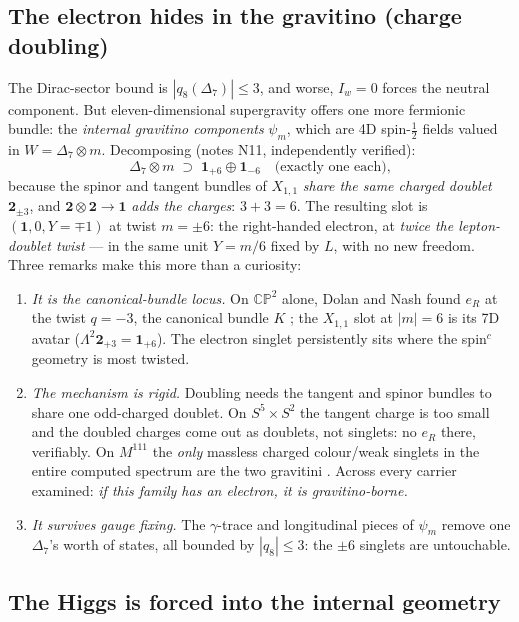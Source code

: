 \documentclass[11pt]{article}
\newcommand{\X}{X_{1,1}}
\newcommand{\CP}{\mathbb{CP}}
\newcommand{\Iw}{I_w}
\begin{document}
\subsection{The electron hides in the gravitino (charge doubling)}

The Dirac-sector bound is $|q_8(\Delta_7)|\le 3$, and worse, $\Iw=0$ forces the neutral
component. But eleven-dimensional supergravity offers one more fermionic bundle: the
\emph{internal gravitino components} $\psi_m$, which are 4D spin-$\tfrac12$ fields valued in
$W=\Delta_7\otimes m$. Decomposing (notes N11, independently verified):
\[
\Delta_7\otimes m \;\supset\; \mathbf 1_{+6}\oplus \mathbf 1_{-6}
\quad\text{(exactly one each),}
\]
because the spinor and tangent bundles of $\X$ \emph{share the same charged doublet}
$\mathbf 2_{\pm3}$, and $\mathbf 2\otimes\mathbf 2\to\mathbf 1$ \emph{adds the charges}:
$3+3=6$. The resulting slot is $(\mathbf 1, 0, Y=\mp1)$ at twist $m=\pm6$: the right-handed
electron, at \emph{twice the lepton-doublet twist} --- in the same unit $Y=m/6$ fixed by $L$,
with no new freedom. Three remarks make this more than a curiosity:
\begin{enumerate}
\item \emph{It is the canonical-bundle locus.} On $\CP^2$ alone, Dolan and Nash found $e_R$
at the twist $q=-3$, the canonical bundle $K$ \cite{DolanNash02}; the $\X$ slot at $|m|=6$ is
its 7D avatar ($\Lambda^2\mathbf 2_{+3}=\mathbf 1_{+6}$). The electron singlet persistently
sits where the spin$^c$ geometry is most twisted.
\item \emph{The mechanism is rigid.} Doubling needs the tangent and spinor bundles to share
one odd-charged doublet. On $S^5\times S^2$ the tangent charge is too small and the doubled
charges come out as doublets, not singlets: no $e_R$ there, verifiably. On $M^{111}$ the
\emph{only} massless charged colour/weak singlets in the entire computed spectrum are the two
gravitini \cite{FabbriFre99}. Across every carrier examined: \emph{if this family has an
electron, it is gravitino-borne.}
\item \emph{It survives gauge fixing.} The $\gamma$-trace and longitudinal pieces of
$\psi_m$ remove one $\Delta_7$'s worth of states, all bounded by $|q_8|\le3$: the $\pm6$
singlets are untouchable.
\end{enumerate}

\subsection{The Higgs is forced into the internal geometry}
\end{document}
